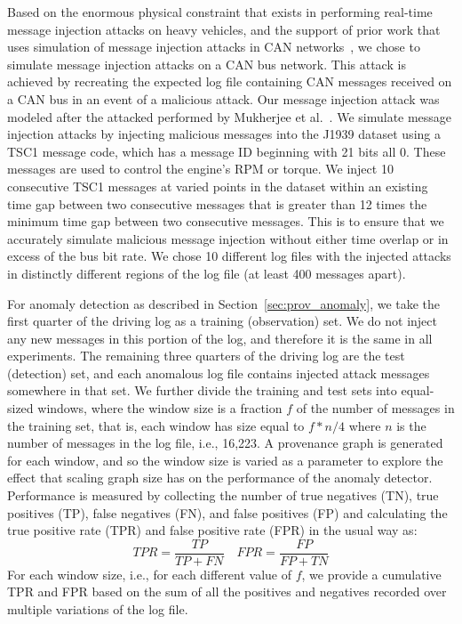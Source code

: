 
Based on the enormous physical constraint that exists in performing real-time message injection attacks on heavy vehicles, and the support of prior work that uses simulation of message injection attacks in CAN networks~\cite{7504089, Otsuka}, we chose to simulate message injection attacks on a CAN bus network. This attack is achieved by recreating the expected log file containing CAN messages received on a CAN bus in an event of a malicious attack. Our message injection attack was modeled after the attacked performed by Mukherjee et al.~\cite{Mukherjee2017APG}. 
%
We simulate message injection attacks by injecting malicious messages into the J1939 dataset using a TSC1 message code, which has a message ID beginning with 21 bits all 0. These messages are used to control the engine's RPM or torque. We inject 10 consecutive TSC1 messages at varied points in the dataset within an existing time gap between two consecutive messages that is greater than 12 times the minimum time gap between two consecutive messages. This is to ensure that we accurately simulate malicious message injection without either time overlap or in excess of the bus bit rate. We chose 10 different log files with the injected attacks in distinctly different regions of the log file (at least 400 messages apart).

For anomaly detection as described in Section~\ref{sec:prov_anomaly}, we take the first quarter of the driving log as a training (observation) set. We do not inject any new messages in this portion of the log, and therefore it is the same in all experiments. The remaining three quarters of the driving log are the test (detection) set, and each anomalous log file contains injected attack messages somewhere in that set. We further divide the training and test sets into equal-sized windows, where the window size is a fraction $f$ of the number of messages in the training set, that is, each window has size equal to $f * n/4$ where $n$ is the number of messages in the log file, i.e., 16,223. A provenance graph is generated for each window, and so the window size is varied as a parameter to explore the effect that scaling graph size has on the performance of the anomaly detector. Performance is measured by collecting the number of true negatives (TN), true positives (TP), false negatives (FN), and false positives (FP) and calculating the true positive rate (TPR) and false positive rate (FPR) in the usual way as:
\[TPR = \frac{TP}{TP+FN}\quad FPR = \frac{FP}{FP+TN}\]
For each window size, i.e., for each different value of $f$, we provide a cumulative TPR and FPR based on the sum of all the positives and negatives recorded over multiple variations of the log file. 


